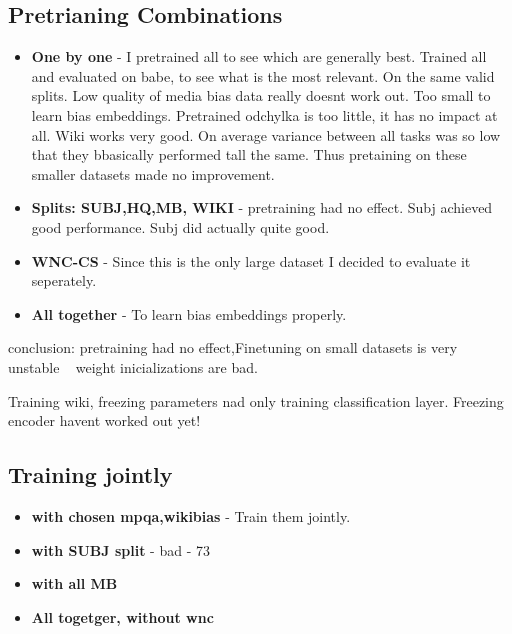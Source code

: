  \subsection{Pretrianing Combinations}
 \begin{itemize}
     \item \textbf{One by one} -  I pretrained all to see which are generally best. Trained all and evaluated on babe, to see what is the most relevant. On the same valid splits. Low quality of media bias data really doesnt work out. Too small to learn bias embeddings.
     Pretrained odchylka is too little, it has no impact at all. Wiki works very good.
     On average variance between all tasks was so low that they bbasically performed tall the same. Thus pretaining on these smaller datasets made no improvement.
     \item \textbf{Splits: SUBJ,HQ,MB, WIKI} - pretraining had no effect. Subj achieved good performance. Subj did actually quite good.
     \item \textbf{WNC-CS} - Since this is the only large dataset I decided to evaluate it seperately.
     \item \textbf{All together} - To learn bias embeddings properly.
 \end{itemize}
 conclusion: pretraining had no effect,Finetuning on small datasets is very unstable ~ weight inicializations are bad.
 
 Training wiki, freezing parameters nad only training classification layer.
 Freezing encoder havent worked out yet!
 
 
 
 
 
\subsection{Training jointly}
\begin{itemize}
    \item \textbf{with chosen mpqa,wikibias} - Train them jointly.
    \item \textbf{with SUBJ split} - bad - 73
    \item \textbf{with all MB}
    \item \textbf{All togetger, without wnc}
\end{itemize}






 
 
 
 
